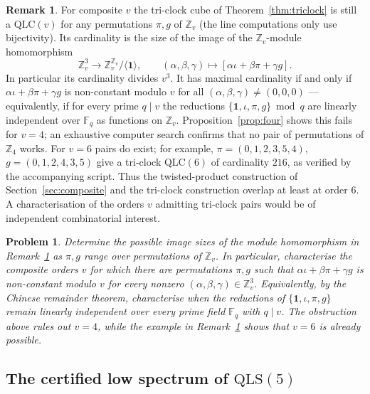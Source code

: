 \documentclass[11pt]{amsart}
\newtheorem{problem}[theorem]{Problem}
\theoremstyle{definition}
\newtheorem{remark}[theorem]{Remark}
\newcommand{\Z}{\mathbb{Z}}
\newcommand{\F}{\mathbb{F}}
\newcommand{\QLS}{\mathrm{QLS}}
\newcommand{\QLC}{\mathrm{QLC}}
\begin{document}
\begin{remark}\label{rem:composite-triclock}
For composite $v$ the tri-clock cube of Theorem~\ref{thm:triclock} is still
a $\QLC(v)$ for any permutations $\pi,g$ of $\Z_v$ (the line computations
only use bijectivity).  Its cardinality is the size of the image of the
$\Z_v$-module homomorphism
\[
\Z_v^3\longrightarrow
\Z_v^{\Z_v}/\langle\mathbf1\rangle,\qquad
(\alpha,\beta,\gamma)\longmapsto
[\alpha\iota+\beta\pi+\gamma g].
\]
In particular its cardinality divides $v^3$.  It has maximal cardinality if
and only if
$\alpha\iota+\beta\pi+\gamma g$ is non-constant modulo $v$ for all
$(\alpha,\beta,\gamma)\ne(0,0,0)$ --- equivalently, if for every prime
$q\mid v$ the reductions $\{\mathbf1,\iota,\pi,g\}\bmod q$ are linearly
independent over $\F_q$ as functions on $\Z_v$.  Proposition~\ref{prop:four}
shows this fails for $v=4$; an exhaustive computer search confirms that no
pair of permutations of $\Z_4$ works.  For $v=6$ pairs do exist; for example,
$\pi=(0,1,2,3,5,4)$, $g=(0,1,2,4,3,5)$ give a tri-clock $\QLC(6)$ of
cardinality $216$, as verified by the accompanying script.  Thus the
twisted-product
construction of Section~\ref{sec:composite} and the tri-clock construction
overlap at least at order $6$.  A characterisation of the orders $v$
admitting tri-clock pairs would be of independent combinatorial interest.
\end{remark}

\begin{problem}\label{prob:composite-triclock}
Determine the possible image sizes of the module homomorphism in
Remark~\ref{rem:composite-triclock} as $\pi,g$ range over permutations of
$\Z_v$.  In particular, characterise the composite orders $v$ for which
there are permutations $\pi,g$ such that
$\alpha\iota+\beta\pi+\gamma g$ is non-constant modulo $v$ for every
nonzero $(\alpha,\beta,\gamma)\in\Z_v^3$.  Equivalently, by the Chinese
remainder theorem, characterise when the reductions of
$\{\mathbf1,\iota,\pi,g\}$ remain linearly independent over every prime
field $\F_q$ with $q\mid v$.  The obstruction above rules out $v=4$, while
the example in Remark~\ref{rem:composite-triclock} shows that $v=6$ is
already possible.
\end{problem}

\subsection{The certified low spectrum of \texorpdfstring{$\QLS(5)$}{QLS(5)}}
\label{sec:qls5-spectrum}
\end{document}
